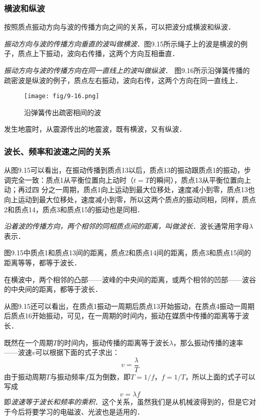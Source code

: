 \subsubsection{横波和纵波} 

按照质点振动方向与波的传播方向之间的关系，可以把波分成横波和纵波．

\textit{振动方向与波的传播方向垂直的波叫做横波}．图9.15所示绳子上的波是横波的例子，质点上下振动，波向右传播，这两个方向互相垂直．

\textit{振动方向与波的传播方向在同一直线上的波叫做纵波}．
图9.16所示沿弹簧传播的疏密波是纵波的例子，质点左右振动，波向右传，这两个方向在同一直线上．
\begin{figure}[htp]\centering
\texttt{[image: fig/9-16.png]}
\caption{沿弹簧传出疏密相间的波}
\end{figure}



发生地震时，从震源传出的地震波，既有横波，又有纵波．

\subsubsection{波长、频率和波速之间的关系}

从图9.15可以看出，在振动传播到质点13以后，质点13的振动跟质点1的振动，步调完全一致：质点1从平衡位置向上动时（$t=T$的瞬间），质点13从平衡位置向上动；再过四
分之一周期，质点1向上运动到最大位移处，速度减小到零，质点13也向上运动到最大位移处，速度减小到零，所以这两个质点的振动同相，同样，质点2和质点14，质点3和质点15的振动也是同相．

\textit{沿着波的传播方向，两个相邻的同相质点间的距离，叫做波长}．波长通常用字母$\lambda$表示．

图9.15中质点1和质点13间的距离，质点2和质点14间的距离，质点3和质点15间的距离等等，都等于波长．

在横波中，两个相邻的凸部——波峰的中央间的距离，或两个相邻的凹部——波谷的中央间的距离，都等于波长．

从图9.15还可以看出，在质点1振动一周期后质点13开始振动，在质点4振动一周期后质点16开始振动，可见，在一周期的时间内，振动在媒质中传播的距离等于波长．

既然在一个周期$T$的时间内，振动传播的距离等于波长$\lambda$，那么振动传播的速率——波速$v$可以根据下面的式子求出：
\[v=\frac{\lambda}{T}\]
由于振动周期$T$与振动频率$f$互为倒数，即$T=1/f$，$f=1/T$，所以上面的式子可以写成
\[v=\lambda f\]
即\textit{波速等于波长和频率的乘积}．这个关系，虽然我们是从机械波得到的，但是它对于今后将要学习的电磁波、光波也是适用的．

